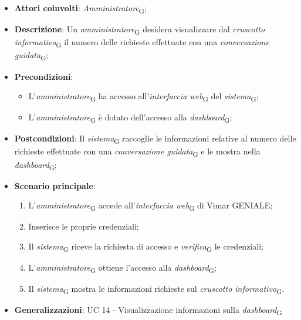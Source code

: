 \begin{itemize}
    \item \textbf{Attori coinvolti}: \textit{Amministratore}\textsubscript{G};
    \item \textbf{Descrizione}: Un \textit{amministratore}\textsubscript{G} desidera visualizzare dal \textit{cruscotto informativo}\textsubscript{G} il numero delle richieste effettuate con una \textit{conversazione guidata}\textsubscript{G};
    \item \textbf{Precondizioni}: 
        \begin{itemize}
            \item L’\textit{amministratore}\textsubscript{G} ha accesso all’\textit{interfaccia web}\textsubscript{G} del \textit{sistema}\textsubscript{G};
            \item L’\textit{amministratore}\textsubscript{G} è dotato dell’accesso alla \textit{dashboard}\textsubscript{G};
        \end{itemize}
    \item \textbf{Postcondizioni}: Il \textit{sistema}\textsubscript{G} raccoglie le informazioni relative al numero delle richieste effettuate con una \textit{conversazione guidata}\textsubscript{G} e le mostra nella \textit{dashboard}\textsubscript{G};
    \item \textbf{Scenario principale}:
    \begin{enumerate}
    \item L’\textit{amministratore}\textsubscript{G} accede all’\textit{interfaccia web}\textsubscript{G} di Vimar GENIALE;
    \item Inserisce le proprie credenziali;
    \item Il \textit{sistema}\textsubscript{G} riceve la richiesta di accesso e \textit{verifica}\textsubscript{G} le credenziali;
    \item L’\textit{amministratore}\textsubscript{G} ottiene l’accesso alla \textit{dashboard}\textsubscript{G};
    \item Il \textit{sistema}\textsubscript{G} mostra le informazioni richieste sul \textit{cruscotto informativo}\textsubscript{G}.
    \end{enumerate}
    \item \textbf{Generalizzazioni}: UC 14 - Visualizzazione informazioni sulla \textit{dashboard}\textsubscript{G}
\end{itemize}

